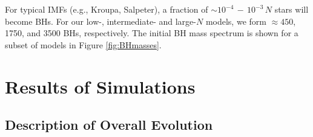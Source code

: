 \documentclass[12pt,preprint]{aastex}
\begin{document}
For typical IMFs (e.g., Kroupa, Salpeter), a fraction of $\sim 10^{-4}\, - \,10^{-3} \, N$ 
stars will become BHs. For our low-, intermediate- and large-$N$ models, 
we form $\approx 450$, 1750, and 3500 BHs, respectively. The initial BH mass spectrum
is shown for a subset of models in Figure \ref{fig:BHmasses}. 











\section{Results of Simulations}

\subsection{Description of Overall Evolution}
\end{document}
